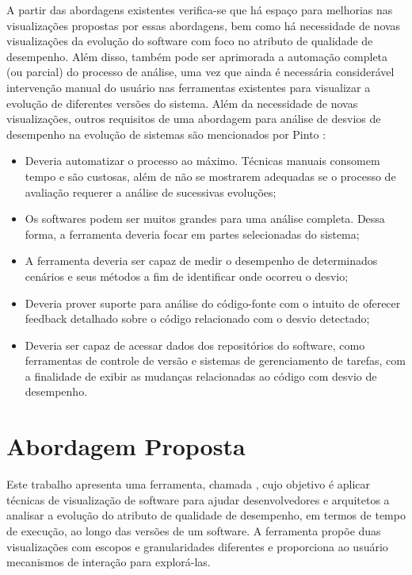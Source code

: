 A partir das abordagens existentes verifica-se que há espaço para melhorias nas visualizações propostas por essas abordagens, bem como há necessidade de novas visualizações da evolução do software com foco no atributo de qualidade de desempenho. Além disso, também pode ser aprimorada a automação completa (ou parcial) do processo de análise, uma vez que ainda é necessária considerável intervenção manual do usuário nas ferramentas existentes para visualizar a evolução de diferentes versões do sistema. Além da necessidade de novas visualizações, outros requisitos de uma abordagem para análise de desvios de desempenho na evolução de sistemas são mencionados por Pinto \cite{Pinto2015}:
\begin{itemize}
	\item Deveria automatizar o processo ao máximo. Técnicas manuais consomem tempo e são custosas, além de não se mostrarem adequadas se o processo de avaliação requerer a análise de sucessivas evoluções;
	\item Os softwares podem ser muitos grandes para uma análise completa. Dessa forma, a ferramenta deveria focar em partes selecionadas do sistema;
	\item A ferramenta deveria ser capaz de medir o desempenho de determinados cenários e seus métodos a fim de identificar onde ocorreu o desvio;
	\item Deveria prover suporte para análise do código-fonte com o intuito de oferecer feedback detalhado sobre o código relacionado com o desvio detectado;
	\item Deveria ser capaz de acessar dados dos repositórios do software, como ferramentas de controle de versão e sistemas de gerenciamento de tarefas, com a finalidade de exibir as mudanças relacionadas ao código com desvio de desempenho.
\end{itemize}

\section{Abordagem Proposta} \label{sec:abordagem-proposta}

Este trabalho apresenta uma ferramenta, chamada \textit{\toolName}, cujo objetivo é aplicar técnicas de visualização de software para ajudar desenvolvedores e arquitetos a analisar a evolução do atributo de qualidade de desempenho, em termos de tempo de execução, ao longo das versões de um software. A ferramenta propõe duas visualizações com escopos e granularidades diferentes e proporciona ao usuário mecanismos de interação para explorá-las.

